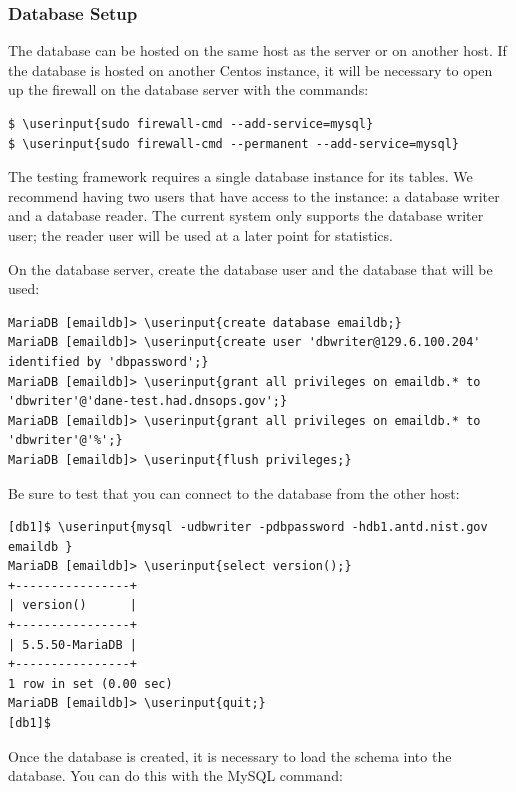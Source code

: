 \documentclass[preprint,3p,11pt]{elsarticle}
\newcommand\userinput[1]{\textbf{#1}}
\begin{document}
\subsubsection{Database Setup}

The database can be hosted on the same host as the server or on
another host. If the database is hosted on another Centos instance,
it will be necessary to open up the firewall on the database server
with the commands:

\begin{Verbatim}[commandchars=\\\{\}]
$ \userinput{sudo firewall-cmd --add-service=mysql}
$ \userinput{sudo firewall-cmd --permanent --add-service=mysql}
\end{Verbatim}

The testing framework requires a single database instance for its
tables. We recommend having two users that have access to the
instance: a database writer and a database reader. The current system
only supports the database writer user; the reader user will be used
at a later point for statistics.

On the database server, create the database user and the database that
will be used:

\begin{Verbatim}[commandchars=\\\{\}]
MariaDB [emaildb]> \userinput{create database emaildb;}
MariaDB [emaildb]> \userinput{create user 'dbwriter@129.6.100.204' identified by 'dbpassword';}
MariaDB [emaildb]> \userinput{grant all privileges on emaildb.* to 'dbwriter'@'dane-test.had.dnsops.gov';}
MariaDB [emaildb]> \userinput{grant all privileges on emaildb.* to 'dbwriter'@'%';}
MariaDB [emaildb]> \userinput{flush privileges;}
\end{Verbatim}

Be sure to test that you can connect to the database from the other host:

\begin{Verbatim}[commandchars=\\\{\}]
[db1]$ \userinput{mysql -udbwriter -pdbpassword -hdb1.antd.nist.gov emaildb }
MariaDB [emaildb]> \userinput{select version();}
+----------------+
| version()      |
+----------------+
| 5.5.50-MariaDB |
+----------------+
1 row in set (0.00 sec)
MariaDB [emaildb]> \userinput{quit;}
[db1]$ 
\end{Verbatim}

Once the database is created, it is necessary to load the schema into
the database. You can do this with the MySQL command:
\end{document}

